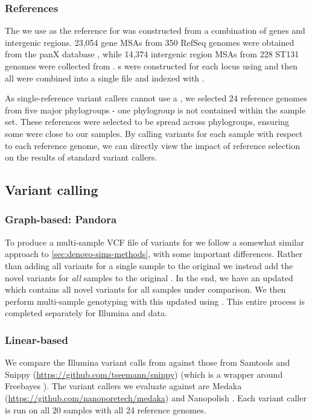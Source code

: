 \subsubsection{References}
The \panrg{} we use as the reference for \pandora{} was constructed from a combination of \ecoli{} genes and intergenic regions. 23,054 gene MSAs from 350 RefSeq genomes were obtained from the panX database \cite{panx}, while 14,374 intergenic region MSAs from 228 ST131 genomes were collected from \cite{thorpe2018}. \prg{}s were constructed for each locus using \makeprg{} and then all were combined into a single \panrg{} file and indexed with \pandora{}.

As single-reference variant callers cannot use a \panrg{}, we selected 24 reference genomes from five major phylogroups - one phylogroup is not contained within the sample set. These references were selected to be spread across phylogroups, ensuring some were close to our samples. By calling variants for each sample with respect to each reference genome, we can directly view the impact of reference selection on the results of standard variant callers.

\subsection{Variant calling}

\subsubsection{Graph-based: Pandora}
To produce a multi-sample VCF file of variants for \pandora{} we follow a somewhat similar approach to \autoref{sec:denovo-sims-methods}, with some important differences. Rather than adding all \denovo{} variants for a single sample to the original \panrg{} we instead add the novel variants for \emph{all} samples to the original \panrg{}. In the end, we have an updated \panrg{} which contains all novel variants for all samples under comparison. We then perform multi-sample genotyping with this updated \panrg{} using \compare{}. This entire process is completed separately for Illumina and \ont{} data.

\subsubsection{Linear-based}
We compare the Illumina variant calls from \pandora{} against those from Samtools \cite{samtools2009} and Snippy (\url{https://github.com/tseemann/snippy}) (which is a wrapper around Freebayes \cite{Garrison2012}). The \ont{} variant callers we evaluate against are Medaka (\url{https://github.com/nanoporetech/medaka}) and Nanopolish \cite{Loman2015}. Each variant caller is run on all 20 samples with all 24 reference genomes. 

